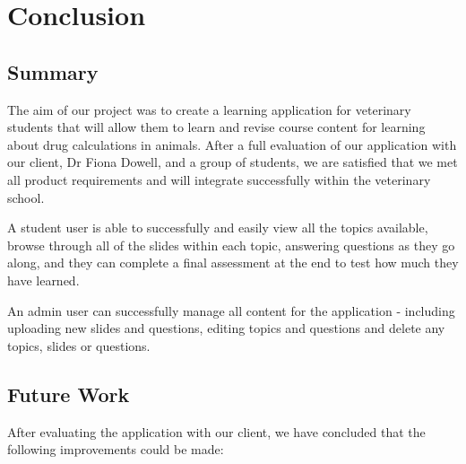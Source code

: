 \documentclass{l3proj}
\begin{document}
{\chapter{Conclusion}
\label{conclusion}

\section{Summary}

The aim of our project was to create a learning application for veterinary students that will allow them to learn and revise course content for learning about drug calculations in animals. After a full evaluation of our application with our client, Dr Fiona Dowell, and a group of students, we are satisfied that we met all product requirements and will integrate successfully within the veterinary school.

A student user is able to successfully and easily view all the topics available, browse through all of the slides within each topic, answering questions as they go along, and they can complete a final assessment at the end to test how much they have learned.

An admin user can successfully manage all content for the application - including uploading new slides and questions, editing topics and questions and delete any topics, slides or questions.

\section{Future Work}


After evaluating the application with our client, we have concluded that the following improvements could be made:

}
\end{document}
